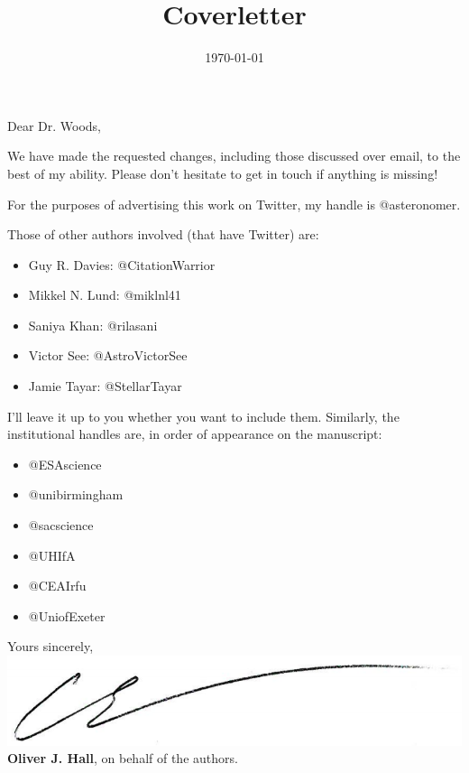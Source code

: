 \documentclass[11pt, a4paper, sans, colorlinks, linkcolor=True]{moderncv}
\title{Coverletter}
\begin{document}
\hypersetup{urlcolor=links}
\recipient{\ }{\ }
\date{\today}
\opening{Dear Dr. Woods,}
\makelettertitle
\justify
\vspace{-0.5cm}

We have made the requested changes, including those discussed over email, to the best of my ability. Please don't hesitate to get in touch if anything is missing!

For the purposes of advertising this work on Twitter, my handle is @asteronomer. 

Those of other authors involved (that have Twitter) are:
\begin{itemize}
	\item Guy R. Davies: @CitationWarrior\\
	\item Mikkel N. Lund: @miklnl41\\
	\item Saniya Khan: @rilasani\\
	\item Victor See: @AstroVictorSee\\
	\item Jamie Tayar: @StellarTayar\\
\end{itemize}

I'll leave it up to you whether you want to include them. Similarly, the institutional handles are, in order of appearance on the manuscript:

\begin{itemize}
	\item @ESAscience\\
	\item @unibirmingham\\
	\item @sacscience\\
	\item @UHIfA\\
	\item @CEAIrfu\\
	\item @UniofExeter\\
\end{itemize}

Yours sincerely, \\
\vspace{0.5em}
\includegraphics[scale=0.2]{signature.png} \\ 
\vspace{0.5em}
\textbf{Oliver J. Hall}, on behalf of the authors. \\
\end{document}
